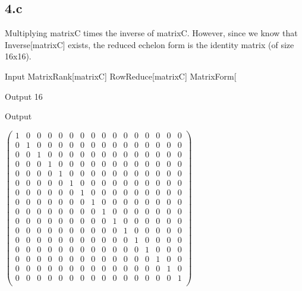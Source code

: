 \documentclass[11pt,a4paper]{article}
\begin{document}
\clearpage

\subsection*{4.c}

Multiplying matrixC times the inverse of matrixC. However, since we know that Inverse[matrixC] exists, the reduced echelon form is the identity matrix
(of size 16x16).

\begin{mmaCell}[moredefined={matrixC}]{Input}
MatrixRank[matrixC]
RowReduce[matrixC]
MatrixForm[%
\end{mmaCell}

\begin{mmaCell}{Output}
16
\end{mmaCell}

\begin{mmaCell}[form=MatrixForm]{Output}

\end{mmaCell}

\begin{doublespace}
\noindent\(\left(
\begin{array}{cccccccccccccccc}
 1 & 0 & 0 & 0 & 0 & 0 & 0 & 0 & 0 & 0 & 0 & 0 & 0 & 0 & 0 & 0 \\
 0 & 1 & 0 & 0 & 0 & 0 & 0 & 0 & 0 & 0 & 0 & 0 & 0 & 0 & 0 & 0 \\
 0 & 0 & 1 & 0 & 0 & 0 & 0 & 0 & 0 & 0 & 0 & 0 & 0 & 0 & 0 & 0 \\
 0 & 0 & 0 & 1 & 0 & 0 & 0 & 0 & 0 & 0 & 0 & 0 & 0 & 0 & 0 & 0 \\
 0 & 0 & 0 & 0 & 1 & 0 & 0 & 0 & 0 & 0 & 0 & 0 & 0 & 0 & 0 & 0 \\
 0 & 0 & 0 & 0 & 0 & 1 & 0 & 0 & 0 & 0 & 0 & 0 & 0 & 0 & 0 & 0 \\
 0 & 0 & 0 & 0 & 0 & 0 & 1 & 0 & 0 & 0 & 0 & 0 & 0 & 0 & 0 & 0 \\
 0 & 0 & 0 & 0 & 0 & 0 & 0 & 1 & 0 & 0 & 0 & 0 & 0 & 0 & 0 & 0 \\
 0 & 0 & 0 & 0 & 0 & 0 & 0 & 0 & 1 & 0 & 0 & 0 & 0 & 0 & 0 & 0 \\
 0 & 0 & 0 & 0 & 0 & 0 & 0 & 0 & 0 & 1 & 0 & 0 & 0 & 0 & 0 & 0 \\
 0 & 0 & 0 & 0 & 0 & 0 & 0 & 0 & 0 & 0 & 1 & 0 & 0 & 0 & 0 & 0 \\
 0 & 0 & 0 & 0 & 0 & 0 & 0 & 0 & 0 & 0 & 0 & 1 & 0 & 0 & 0 & 0 \\
 0 & 0 & 0 & 0 & 0 & 0 & 0 & 0 & 0 & 0 & 0 & 0 & 1 & 0 & 0 & 0 \\
 0 & 0 & 0 & 0 & 0 & 0 & 0 & 0 & 0 & 0 & 0 & 0 & 0 & 1 & 0 & 0 \\
 0 & 0 & 0 & 0 & 0 & 0 & 0 & 0 & 0 & 0 & 0 & 0 & 0 & 0 & 1 & 0 \\
 0 & 0 & 0 & 0 & 0 & 0 & 0 & 0 & 0 & 0 & 0 & 0 & 0 & 0 & 0 & 1 \\
\end{array}
\right)\)
\end{doublespace}
\end{document}
